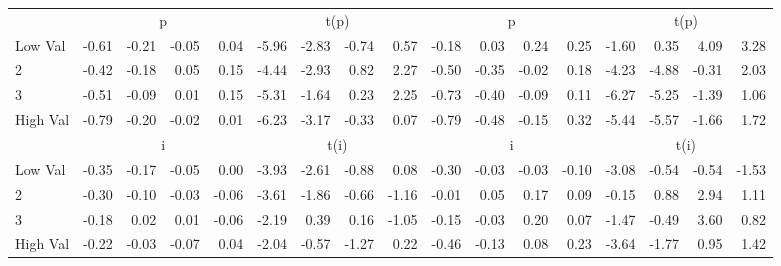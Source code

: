 \begin{table}[!ht]
\begin{tabular}{lrrrrrrrrrrrrrrrr}
  
    
      & \multicolumn{4}{c}{p} & \multicolumn{4}{c}{t(p)}
    
      & \multicolumn{4}{c}{p} & \multicolumn{4}{c}{t(p)}
    
    \\
      \cmidrule(r){2-5} \cmidrule(r){6-9} \cmidrule(r){10-13} \cmidrule(r){14-17}

    Low Val   & -0.61  & -0.21  & -0.05  & 0.04  & -5.96  & -2.83  & -0.74  & 0.57  & -0.18  & 0.03  & 0.24  & 0.25  & -1.60  & 0.35  & 4.09  & 3.28  \\
           2  & -0.42  & -0.18  & 0.05  & 0.15  & -4.44  & -2.93  & 0.82  & 2.27  & -0.50  & -0.35  & -0.02  & 0.18  & -4.23  & -4.88  & -0.31  & 2.03  \\
           3  & -0.51  & -0.09  & 0.01  & 0.15  & -5.31  & -1.64  & 0.23  & 2.25  & -0.73  & -0.40  & -0.09  & 0.11  & -6.27  & -5.25  & -1.39  & 1.06  \\
    High Val  & -0.79  & -0.20  & -0.02  & 0.01  & -6.23  & -3.17  & -0.33  & 0.07  & -0.79  & -0.48  & -0.15  & 0.32  & -5.44  & -5.57  & -1.66  & 1.72  \\

  
    
      & \multicolumn{4}{c}{i} & \multicolumn{4}{c}{t(i)}
    
      & \multicolumn{4}{c}{i} & \multicolumn{4}{c}{t(i)}
    
    \\
      \cmidrule(r){2-5} \cmidrule(r){6-9} \cmidrule(r){10-13} \cmidrule(r){14-17}

    Low Val   & -0.35  & -0.17  & -0.05  & 0.00  & -3.93  & -2.61  & -0.88  & 0.08  & -0.30  & -0.03  & -0.03  & -0.10  & -3.08  & -0.54  & -0.54  & -1.53  \\
           2  & -0.30  & -0.10  & -0.03  & -0.06  & -3.61  & -1.86  & -0.66  & -1.16  & -0.01  & 0.05  & 0.17  & 0.09  & -0.15  & 0.88  & 2.94  & 1.11  \\
           3  & -0.18  & 0.02  & 0.01  & -0.06  & -2.19  & 0.39  & 0.16  & -1.05  & -0.15  & -0.03  & 0.20  & 0.07  & -1.47  & -0.49  & 3.60  & 0.82  \\
    High Val  & -0.22  & -0.03  & -0.07  & 0.04  & -2.04  & -0.57  & -1.27  & 0.22  & -0.46  & -0.13  & 0.08  & 0.23  & -3.64  & -1.77  & 0.95  & 1.42  \\

  

  \bottomrule
\end{tabular}
\label{tbl:32_Size_BM_Prior_FF2016}
\end{table}
